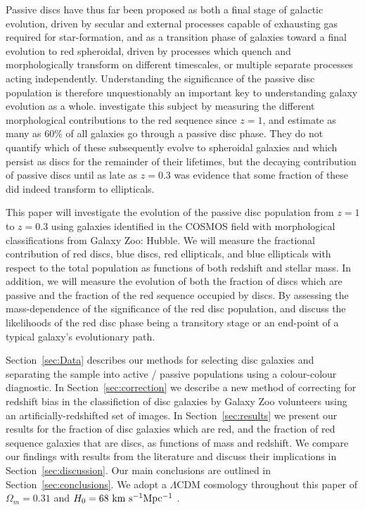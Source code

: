 \documentclass[useAMS,usenatbib]{mn2e}
\begin{document}
Passive discs have thus far been proposed as both a final stage of galactic evolution, driven by secular and external processes capable of exhausting gas required for star-formation, and as a transition phase of galaxies toward a final evolution to red spheroidal, driven by processes which quench and morphologically transform on different timescales, or multiple separate processes acting independently. Understanding the significance of the passive disc population is therefore unquestionably an important key to understanding galaxy evolution as a whole. \citet{Bundy2010} investigate this subject by measuring the different morphological contributions to the red sequence since $z=1$, and estimate as many as 60\% of all galaxies go through a passive disc phase. They do not quantify which of these subsequently evolve to spheroidal galaxies and which persist as discs for the remainder of their lifetimes, but the decaying contribution of passive discs until as late as $z=0.3$ was evidence that some fraction of these did indeed transform to ellipticals.

This paper will investigate the evolution of the passive disc population from $z=1$ to $z=0.3$ using galaxies identified in the COSMOS field with morphological classifications from Galaxy Zoo: Hubble. We will measure the fractional contribution of red discs, blue discs, red ellipticals, and blue ellipticals with respect to the total population as functions of both redshift and stellar mass. In addition, we will measure the evolution of both the fraction of discs which are passive and the fraction of the red sequence occupied by discs. By assessing the mass-dependence of the significance of the red disc population, and discuss the likelihoods of the red disc phase being a transitory stage or an end-point of a typical galaxy's evolutionary path.

Section~\ref{sec:Data} describes our methods for selecting disc galaxies and separating the sample into active / passive populations using a colour-colour diagnostic. In Section~\ref{sec:correction} we describe a new method of correcting for redshift bias in the classifiction of disc galaxies by Galaxy Zoo volunteers using an artificially-redshifted set of images. In Section~\ref{sec:results} we present our results for the fraction of disc galaxies which are red, and the fraction of red sequence galaxies that are discs, as functions of mass and redshift. We compare our findings with results from the literature and discuss their implications in Section~\ref{sec:discussion}. Our main conclusions are outlined in Section~\ref{sec:conclusions}. We adopt a $\Lambda$CDM cosmology throughout this paper of $\Omega_m=0.31$ and $H_0=68~\rm km~s^{-1} Mpc^{-1}$ \citep{PlanckCollaboration2015}.
\end{document}
